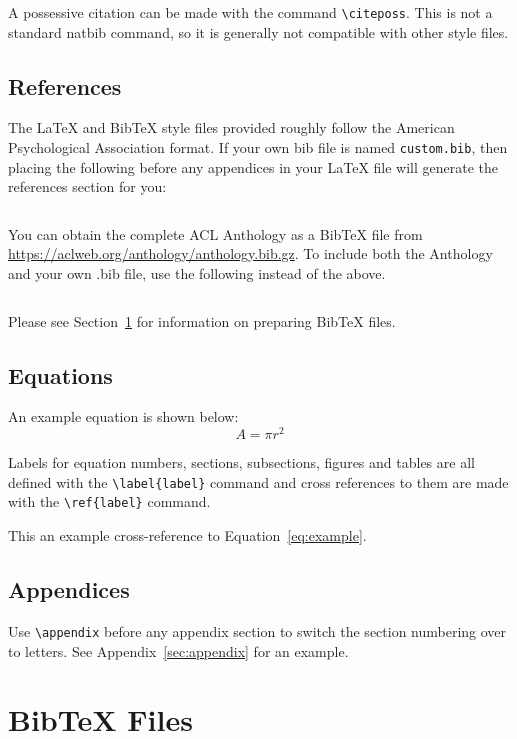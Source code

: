 \documentclass[11pt]{article}
\begin{document}
A possessive citation can be made with the command \verb|\citeposs|.
This is not a standard natbib command, so it is generally not compatible
with other style files.

\subsection{References}

\nocite{Ando2005,andrew2007scalable,rasooli-tetrault-2015}

The \LaTeX{} and Bib\TeX{} style files provided roughly follow the American Psychological Association format.
If your own bib file is named \texttt{custom.bib}, then placing the following before any appendices in your \LaTeX{} file will generate the references section for you:
\begin{quote}
\begin{verbatim}

\end{verbatim}
\end{quote}

You can obtain the complete ACL Anthology as a Bib\TeX{} file from \url{https://aclweb.org/anthology/anthology.bib.gz}.
To include both the Anthology and your own .bib file, use the following instead of the above.
\begin{quote}
\begin{verbatim}

\end{verbatim}
\end{quote}

Please see Section~\ref{sec:bibtex} for information on preparing Bib\TeX{} files.

\subsection{Equations}

An example equation is shown below:
\begin{equation}
  \label{eq:example}
  A = \pi r^2
\end{equation}

Labels for equation numbers, sections, subsections, figures and tables
are all defined with the \verb|\label{label}| command and cross references
to them are made with the \verb|\ref{label}| command.

This an example cross-reference to Equation~\ref{eq:example}.

\subsection{Appendices}

\appendix
Use \verb|\appendix| before any appendix section to switch the section numbering over to letters. See Appendix~\ref{sec:appendix} for an example.




\section{Bib\TeX{} Files}
\label{sec:bibtex}
\end{document}
